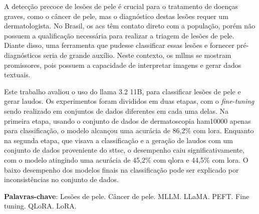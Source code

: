 \begin{resumo}
    A detecção precoce de lesões de pele é crucial para o tratamento de doenças graves, como o câncer de pele, mas o
    diagnóstico destas lesões requer um dermatologista. No Brasil, os \ac{acs} têm contato direto com a população,
    porém não possuem a qualificação necessária para realizar a triagem de lesões de pele. Diante disso, uma ferramenta
    que pudesse classificar essas lesões e fornecer pré-diagnósticos seria de grande auxílio. Neste contexto, os
    \acp{mllm} se mostram promissores, pois possuem a capacidade de interpretar imagens e gerar dados textuais.

    Este trabalho avaliou o uso do \ac{llama} 3.2 11B, para classificar lesões de pele e gerar laudos. Os experimentos
    foram divididos em duas etapas, com o \textit{fine-tuning} sendo realizado em conjuntos de dados diferentes em cada
    uma delas. Na primeira etapa, usando o conjunto de dados de dermatoscopia \ac{ham10000} apenas para classificação,
    o modelo alcançou uma acurácia de 86,2\% com \ac{lora}. Enquanto na segunda etapa, que visava a classificação e a
    geração de laudos com um conjunto de dados proveniente do \ac{sttsc}, o desempenho caiu significativamente, com o
    modelo atingindo uma acurácia de 45,2\% com \ac{qlora} e 44,5\% com \ac{lora}. O baixo desempenho dos modelos
    finais na classificação pode ser explicado por inconsistências no conjunto de dados.

    \textbf{Palavras-chave}: Lesões de pele. Câncer de pele. MLLM. LLaMA. PEFT. Fine tuning. QLoRA. LoRA.
\end{resumo}
